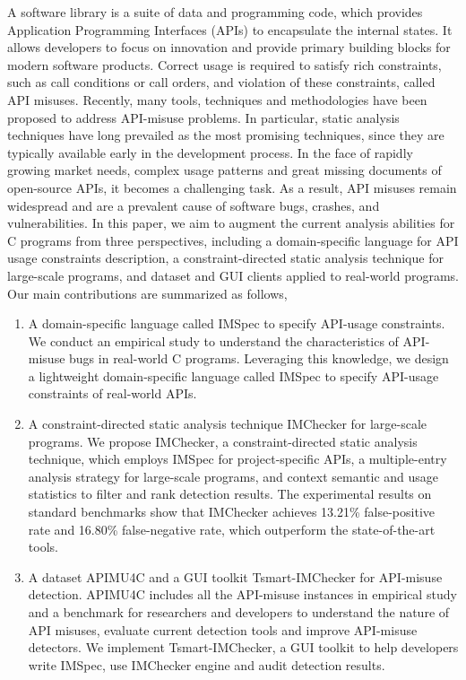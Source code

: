 \begin{eabstract}
   A software library is a suite of data and programming code, which provides Application Programming Interfaces (APIs) to encapsulate the internal states. 
   It allows developers to focus on innovation and provide primary building blocks for modern software products.
   Correct usage is required to satisfy rich constraints, such as call conditions or call orders, and violation of these constraints, called API misuses.
   Recently, many tools, techniques and methodologies have been proposed to address API-misuse problems. 
   In particular, static analysis techniques have long prevailed as the most promising techniques, since they are typically available early in the development process.
   In the face of rapidly growing market needs, complex usage patterns and great missing documents of open-source APIs, 
   it becomes a challenging task.
   As a result, API misuses remain widespread and are a prevalent cause of software bugs, crashes, and vulnerabilities.
   In this paper, we aim to augment the current analysis abilities for C programs from three perspectives, including a domain-specific language for API usage constraints description, 
   a constraint-directed static analysis technique for large-scale programs,
   and dataset and GUI clients applied to real-world programs.
   Our main contributions are summarized as follows,
   \begin{enumerate}
   	\item A domain-specific language called IMSpec to specify API-usage constraints.
   	We conduct an empirical study to understand the characteristics
   	of API-misuse bugs in real-world C programs.
   	Leveraging this knowledge, we design a lightweight domain-specific language called IMSpec to specify API-usage constraints of real-world APIs.
   	\item A constraint-directed static analysis technique IMChecker for large-scale programs.
   	We propose IMChecker, a constraint-directed static analysis technique, which employs IMSpec for project-specific APIs, a multiple-entry analysis strategy for large-scale programs, and context semantic and usage statistics to filter and rank detection results.
   	The experimental results on standard benchmarks show that IMChecker achieves 13.21\% false-positive rate and 16.80\% false-negative rate, 
   	which outperform the state-of-the-art tools.
   	\item A dataset APIMU4C and a GUI toolkit Tsmart-IMChecker for API-misuse detection.
   	APIMU4C includes all the API-misuse instances in empirical study and a benchmark for researchers and developers to understand the nature of API misuses, evaluate current detection tools and improve API-misuse detectors.
   	We implement Tsmart-IMChecker, a GUI toolkit to help developers write IMSpec, use IMChecker engine and audit detection results.
   \end{enumerate}


\end{eabstract}
